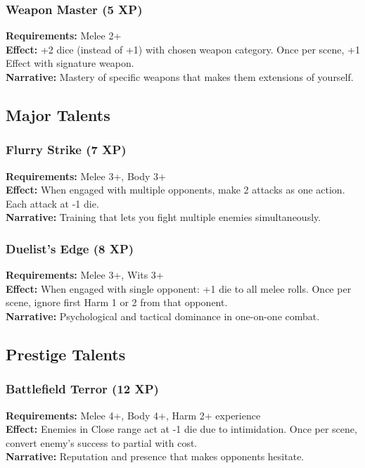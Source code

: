 \subsubsection{Weapon Master (5 XP)}
\textbf{Requirements:} Melee 2+ \\
\textbf{Effect:} +2 dice (instead of +1) with chosen weapon category. Once per scene, +1 Effect with signature weapon. \\
\textbf{Narrative:} Mastery of specific weapons that makes them extensions of yourself.

\subsection{Major Talents}

\subsubsection{Flurry Strike (7 XP)}
\textbf{Requirements:} Melee 3+, Body 3+ \\
\textbf{Effect:} When engaged with multiple opponents, make 2 attacks as one action. Each attack at -1 die. \\
\textbf{Narrative:} Training that lets you fight multiple enemies simultaneously.

\subsubsection{Duelist's Edge (8 XP)}
\textbf{Requirements:} Melee 3+, Wits 3+ \\
\textbf{Effect:} When engaged with single opponent: +1 die to all melee rolls. Once per scene, ignore first Harm 1 or 2 from that opponent. \\
\textbf{Narrative:} Psychological and tactical dominance in one-on-one combat.

\subsection{Prestige Talents}

\subsubsection{Battlefield Terror (12 XP)}
\textbf{Requirements:} Melee 4+, Body 4+, Harm 2+ experience \\
\textbf{Effect:} Enemies in Close range act at -1 die due to intimidation. Once per scene, convert enemy's success to partial with cost. \\
\textbf{Narrative:} Reputation and presence that makes opponents hesitate.

